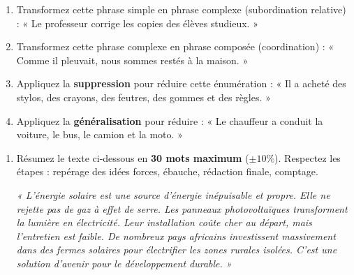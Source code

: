 \documentclass[11pt]{article}
\begin{document}
\begin{exercice}
\begin{enumerate}
    \item Transformez cette phrase simple en phrase complexe (subordination relative) : « Le professeur corrige les copies des élèves studieux. »
    \item Transformez cette phrase complexe en phrase composée (coordination) : « Comme il pleuvait, nous sommes restés à la maison. »
    \item Appliquez la \textbf{suppression} pour réduire cette énumération : « Il a acheté des stylos, des crayons, des feutres, des gommes et des règles. »
    \item Appliquez la \textbf{généralisation} pour réduire : « Le chauffeur a conduit la voiture, le bus, le camion et la moto. »
\end{enumerate}
\end{exercice}

\begin{exercice}
\begin{enumerate}
    \item Résumez le texte ci-dessous en \textbf{30 mots maximum} ($\pm 10\%$). Respectez les étapes : repérage des idées forces, ébauche, rédaction finale, comptage.

    \textit{« L'énergie solaire est une source d'énergie inépuisable et propre. Elle ne rejette pas de gaz à effet de serre. Les panneaux photovoltaïques transforment la lumière en électricité. Leur installation coûte cher au départ, mais l'entretien est faible. De nombreux pays africains investissent massivement dans des fermes solaires pour électrifier les zones rurales isolées. C'est une solution d'avenir pour le développement durable. »}
\end{enumerate}
\end{exercice}
\end{document}
